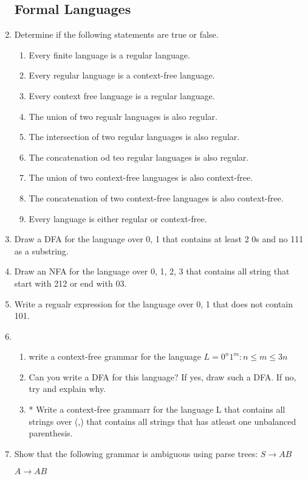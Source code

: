 \documentclass[12pt]{article}
\begin{document}
\begin{enumerate}
\subsection{Formal Languages}
\item Determine if the following statements are true or false.
\begin{enumerate}
	\item Every finite language is a regular language.
	\item Every regular language is a context-free language.
	\item Every context free language is a regular language.
	\item The union of two regualr languages is also regular.
	\item The intersection of two regular languages is also regular.
	\item The concatenation od teo regular languages is also regular.
	\item The union of two context-free languages is also context-free.
	\item The concatenation of two context-free languages is also context-free.
	\item Every language is either regular or context-free.
\end{enumerate}
\item Draw a DFA for the language over {0, 1} that contains at least 2 0s and no 111 as a substring.
\item Draw an NFA for the language over {0, 1, 2, 3} that contains all string that start with 212 or end with 03.
\item Write a regualr expression for the language over {0, 1} that does not contain 101.
\item \begin{enumerate}
	\item write a context-free grammar for the language $L= {0^n1^m:n \le m \le 3n} $
	\item Can you write a DFA for this language? If yes, draw such a DFA. If no, try and explain why.
	\item * Write a context-free grammarr for the language L  that contains all strings over {(,)} that contains all strings that has atleast one unbalanced parenthesis.
\end{enumerate}
\item Show that the following grammar is ambiguous using parse trees:
$ S \rightarrow AB$

$ A \rightarrow AB $


\end{enumerate}
\end{document}
